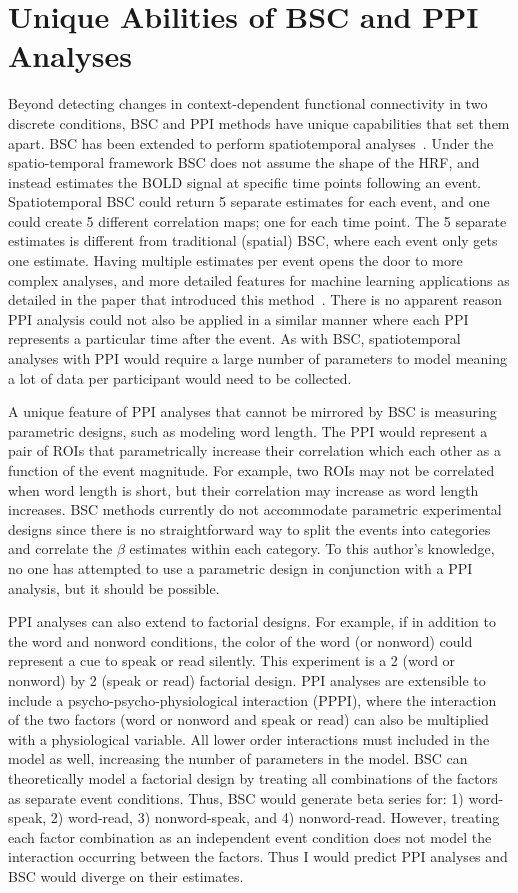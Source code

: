 \documentclass[phd,figures,tables,ackpage,abstractpage,publicabstractpage]{uithesis}
\begin{document}
\section{Unique Abilities of BSC and PPI Analyses}

Beyond detecting changes in context-dependent functional connectivity in two discrete
conditions, BSC and PPI methods have unique capabilities that set them apart.
BSC has been extended to perform spatiotemporal analyses~\cite{Turner2012a}.
Under the spatio-temporal framework BSC does not assume the shape of the HRF,
and instead estimates the BOLD signal at specific time points following an event.
Spatiotemporal BSC could return 5 separate estimates for each event, and
one could create 5 different correlation maps; one for each time point.
The 5 separate estimates is different from traditional (spatial) BSC,
where each event only gets one estimate.
Having multiple estimates per event opens the door to more complex analyses,
and more detailed features for machine learning applications as detailed in
the paper that introduced this method~\cite{Turner2012a}.
There is no apparent reason PPI analysis could not also be applied in a similar manner
where each PPI represents a particular time after the event.
As with BSC, spatiotemporal analyses with PPI would require a large number
of parameters to model meaning a lot of data per participant would need to be
collected.

A unique feature of PPI analyses that cannot be mirrored by BSC is
measuring parametric designs, such as modeling word length.
The PPI would represent a pair of ROIs that parametrically increase
their correlation which each other as a function of the event magnitude.
For example, two ROIs may not be correlated when word length is short,
but their correlation may increase as word length increases.
BSC methods currently do not accommodate parametric experimental designs
since there is no straightforward way to split the events into categories
and correlate the $\beta$ estimates within each category.
To this author's knowledge, no one has attempted to use a parametric design
in conjunction with a PPI analysis, but it should be possible.

PPI analyses can also extend to factorial designs.
For example, if in addition to the word and nonword conditions,
the color of the word (or nonword) could represent a cue to speak or read silently.
This experiment is a 2 (word or nonword) by 2 (speak or read) factorial design.
PPI analyses are extensible to include a psycho-psycho-physiological interaction (PPPI),
where the interaction of the two factors (word or nonword and speak or read) can also be
multiplied with a physiological variable.
All lower order interactions must included in the model as well, increasing the number
of parameters in the model.
BSC can theoretically model a factorial design by treating all combinations of the factors
as separate event conditions.
Thus, BSC would generate beta series for: 1) word-speak, 2) word-read, 3) nonword-speak,
and 4) nonword-read.
However, treating each factor combination as an independent event condition does not model the
interaction occurring between the factors.
Thus I would predict PPI analyses and BSC would diverge on their estimates.
\end{document}
